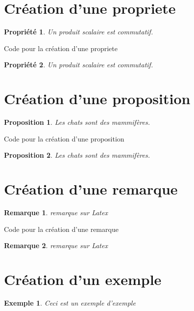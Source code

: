\documentclass[12pt]{report}
\newtheorem{propriete}{Propriété}
\newtheorem{proposition}{Proposition}
\newtheorem{remarque}{Remarque}
\newtheorem{exemple}{Exemple}
\begin{document}
\section{Création d'une propriete}

\begin{propriete}
    Un produit scalaire est commutatif.
\end{propriete}

\begin{Latex}{Code pour la création d'une propriete}
\begin{propriete}
    Un produit scalaire est commutatif.
\end{propriete}
\end{Latex}

\section{Création d'une proposition}

\begin{proposition}
    Les chats sont des mammifères.
\end{proposition}

\begin{Latex}{Code pour la création d'une proposition}
\begin{proposition}
    Les chats sont des mammifères.
\end{proposition}
\end{Latex}

\section{Création d'une remarque}

\begin{remarque}
remarque sur Latex
\end{remarque}

\begin{Latex}{Code pour la création d'une remarque}
\begin{remarque}
remarque sur Latex
\end{remarque}
\end{Latex}

\section{Création d'un exemple}

\begin{exemple}
    Ceci est un exemple d'exemple
\end{exemple}
\end{document}
